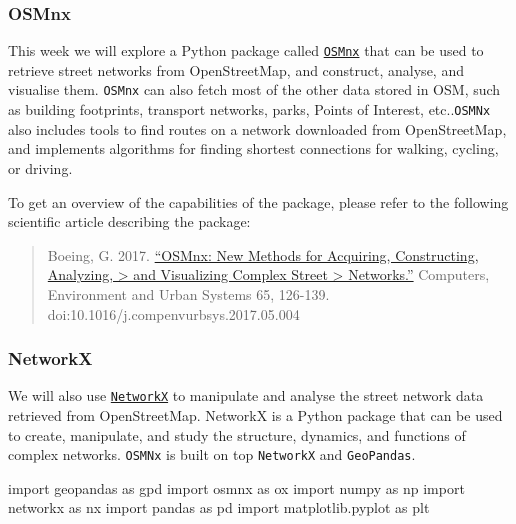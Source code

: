 \documentclass[
  letterpaper,
  DIV=11,
  numbers=noendperiod]{scrreprt}
\newenvironment{Shaded}{\begin{snugshade}}{\end{snugshade}}
\newcommand{\ImportTok}[1]{\textcolor[rgb]{0.00,0.46,0.62}{#1}}
\newcommand{\NormalTok}[1]{\textcolor[rgb]{0.00,0.23,0.31}{#1}}
\begin{document}
\hypertarget{osmnx}{%
\subsubsection{OSMnx}\label{osmnx}}

This week we will explore a Python package called
\href{https://github.com/gboeing/osmnx}{\texttt{OSMnx}} that can be used
to retrieve street networks from OpenStreetMap, and construct, analyse,
and visualise them. \texttt{OSMnx} can also fetch most of the other data
stored in OSM, such as building footprints, transport networks, parks,
Points of Interest, etc..\texttt{OSMNx} also includes tools to find
routes on a network downloaded from OpenStreetMap, and implements
algorithms for finding shortest connections for walking, cycling, or
driving.

To get an overview of the capabilities of the package, please refer to
the following scientific article describing the package:

\begin{quote}
Boeing, G. 2017.
\href{https://www.researchgate.net/publication/309738462_OSMnx_New_Methods_for_Acquiring_Constructing_Analyzing_and_Visualizing_Complex_Street_Networks}{``OSMnx:
New Methods for Acquiring, Constructing, Analyzing, \textgreater{} and
Visualizing Complex Street \textgreater{} Networks.''} Computers,
Environment and Urban Systems 65, 126-139.
doi:10.1016/j.compenvurbsys.2017.05.004
\end{quote}

\hypertarget{networkx}{%
\subsubsection{NetworkX}\label{networkx}}

We will also use
\href{https://networkx.github.io/documentation//}{\texttt{NetworkX}} to
manipulate and analyse the street network data retrieved from
OpenStreetMap. NetworkX is a Python package that can be used to create,
manipulate, and study the structure, dynamics, and functions of complex
networks. \texttt{OSMNx} is built on top \texttt{NetworkX} and
\texttt{GeoPandas}.

\begin{Shaded}
\begin{Highlighting}[]
\ImportTok{import}\NormalTok{ geopandas }\ImportTok{as}\NormalTok{ gpd}
\ImportTok{import}\NormalTok{ osmnx }\ImportTok{as}\NormalTok{ ox}
\ImportTok{import}\NormalTok{ numpy }\ImportTok{as}\NormalTok{ np}
\ImportTok{import}\NormalTok{ networkx }\ImportTok{as}\NormalTok{ nx}
\ImportTok{import}\NormalTok{ pandas }\ImportTok{as}\NormalTok{ pd}
\ImportTok{import}\NormalTok{ matplotlib.pyplot }\ImportTok{as}\NormalTok{ plt}
\end{Highlighting}
\end{Shaded}
\end{document}
